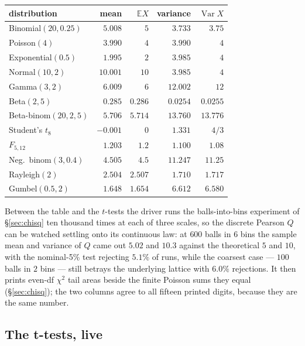 \documentclass[11pt]{article}
\numberwithin{equation}{section}
\newcommand{\E}{\mathbb{E}}
\newcommand{\Var}{\operatorname{Var}}
\begin{document}
\begin{center}\small
\begin{tabular}{lrrrr}
\toprule
distribution & mean & $\E X$ & variance & $\Var X$ \\
\midrule
Binomial$(20,0.25)$ & $5.008$  & $5$    & $3.733$  & $3.75$ \\
Poisson$(4)$        & $3.990$  & $4$    & $3.990$  & $4$ \\
Exponential$(0.5)$  & $1.995$  & $2$    & $3.985$  & $4$ \\
Normal$(10,2)$      & $10.001$ & $10$   & $3.985$  & $4$ \\
Gamma$(3,2)$        & $6.009$  & $6$    & $12.002$ & $12$ \\
Beta$(2,5)$         & $0.285$  & $0.286$& $0.0254$ & $0.0255$ \\
Beta-binom$(20,2,5)$& $5.706$  & $5.714$& $13.760$ & $13.776$ \\
Student's $t_8$     & $-0.001$ & $0$    & $1.331$  & $4/3$ \\
$F_{5,12}$          & $1.203$  & $1.2$  & $1.100$  & $1.08$ \\
Neg.\ binom$(3,0.4)$& $4.505$  & $4.5$  & $11.247$ & $11.25$ \\
Rayleigh$(2)$       & $2.504$  & $2.507$& $1.710$  & $1.717$ \\
Gumbel$(0.5,2)$     & $1.648$  & $1.654$& $6.612$  & $6.580$ \\
\bottomrule
\end{tabular}
\end{center}

Between the table and the $t$-tests the driver runs the balls-into-bins
experiment of \S\ref{sec:chisq} ten thousand times at each of three
scales, so the discrete Pearson $Q$ can be watched settling onto its
continuous law: at $600$ balls in $6$ bins the sample mean and variance
of $Q$ came out $5.02$ and $10.3$ against the theoretical $5$ and $10$,
with the nominal-5\% test rejecting $5.1\%$ of runs, while the coarsest
case --- $100$ balls in $2$ bins --- still betrays the underlying
lattice with $6.0\%$ rejections.  It then prints even-df $\chi^2$ tail
areas beside the finite Poisson sums they equal
(\S\ref{sec:chisq}); the two columns agree to all fifteen printed
digits, because they are the same number.

\subsection{The t-tests, live}\label{sec:demos}
\end{document}

